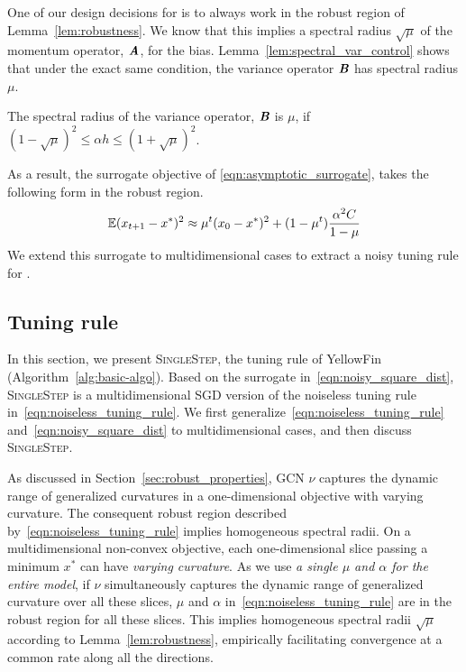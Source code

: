 One of our design decisions for \tuner 
is to always work in the robust region of Lemma~\ref{lem:robustness}.
We know that this implies a spectral radius $\sqrt{\mu}$ of the momentum operator, $\bm{\mathit{A}}$, for the bias. 
Lemma~\ref{lem:spectral_var_control} shows that under the exact same condition, the variance operator $\bm{\mathit{B}}$ has spectral radius $\mu$.
 

\begin{lemma}
\label{lem:spectral_var_control}
The spectral radius of the variance operator, $\bm{\mathit{B}}$ is $\mu$, if ${(1-\sqrt{\mu})^2} \leq  \alpha h \leq {(1+\sqrt{\mu})^2}$.
\end{lemma}

As a result, the surrogate objective of \eqref{eqn:asymptotic_surrogate}, takes the following form in the robust region.  
\begin{equation}
	\mathbb{E} ( x_{t+1} - x^{*} )^2 
	\approx \mu^t ( x_0 - x^{*} )^2
		+ (1-\mu^t) \frac{\alpha^2 C}{1-\mu}
	\label{eqn:noisy_square_dist}
\end{equation}
We extend this surrogate to multidimensional cases to extract a noisy tuning rule for \tuner.

\subsection{Tuning rule}
\label{sec:tuner}
\vspace{-0.25em}

In this section, we present \textsc{SingleStep}, the tuning rule of YellowFin (Algorithm~\ref{alg:basic-algo}). Based on the surrogate in~\eqref{eqn:noisy_square_dist}, \textsc{SingleStep} is a multidimensional SGD version of the noiseless tuning rule in~\eqref{eqn:noiseless_tuning_rule}. We first generalize~\eqref{eqn:noiseless_tuning_rule} and~\eqref{eqn:noisy_square_dist} to multidimensional cases, and then discuss \textsc{SingleStep}.%

As discussed in Section~\ref{sec:robust_properties}, GCN $\nu$ captures the dynamic range of generalized curvatures in a one-dimensional objective with varying curvature. The consequent robust region described by~\eqref{eqn:noiseless_tuning_rule} implies homogeneous spectral radii. 
On a multidimensional non-convex objective, each one-dimensional slice passing a minimum $x^*$ can have \emph{varying curvature}. As we use \emph{a single $\mu$ and $\alpha$ for the entire model}, if $\nu$ simultaneously captures the dynamic range of generalized curvature over all these slices, $\mu$ and $\alpha$ in~\eqref{eqn:noiseless_tuning_rule} are in the robust region for all these slices. This implies homogeneous spectral radii $\sqrt{\mu}$ according to Lemma~\ref{lem:robustness}, empirically facilitating convergence at a common rate along all the directions. 

